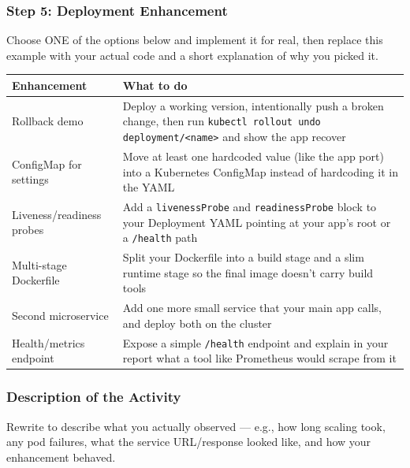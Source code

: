 \documentclass[12pt,a4paper]{article}
\newcommand{\sizeTwelve}{\fontsize{12pt}{14.5pt}\selectfont}  %
\begin{document}
\subsubsection*{Step 5: Deployment Enhancement }
\begin{studentnote}
Choose ONE of the options below and implement it for real, then replace this example with your actual code and a short explanation of why you picked it.
\end{studentnote}

{\sizeTwelve
\setlength{\tabcolsep}{4pt}
\renewcommand{\arraystretch}{1.25}
\begin{longtable}{|>{\raggedright\arraybackslash}p{4.4cm}|>{\raggedright\arraybackslash}p{9.0cm}|}
\hline
\textbf{Enhancement} & \textbf{What to do} \\
\hline
\endhead
Rollback demo & Deploy a working version, intentionally push a broken change, then run \texttt{kubectl rollout undo deployment/<name>} and show the app recover \\
\hline
ConfigMap for settings & Move at least one hardcoded value (like the app port) into a Kubernetes ConfigMap instead of hardcoding it in the YAML \\
\hline
Liveness/readiness probes & Add a \texttt{livenessProbe} and \texttt{readinessProbe} block to your Deployment YAML pointing at your app's root or a \texttt{/health} path \\
\hline
Multi-stage Dockerfile & Split your Dockerfile into a build stage and a slim runtime stage so the final image doesn't carry build tools \\
\hline
Second microservice & Add one more small service that your main app calls, and deploy both on the cluster \\
\hline
Health/metrics endpoint & Expose a simple \texttt{/health} endpoint and explain in your report what a tool like Prometheus would scrape from it \\
\hline
\end{longtable}
\par}

\subsubsection*{Description of the Activity}
\begin{studentnote}
Rewrite to describe what you actually observed --- e.g., how long scaling took, any pod failures, what the service URL/response looked like, and how your enhancement behaved.
\end{studentnote}
\end{document}
